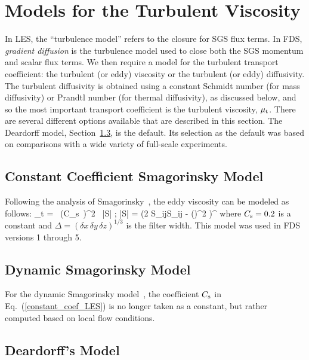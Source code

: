 \section{Models for the Turbulent Viscosity}
\label{section:turbulent_viscosity}

In LES, the ``turbulence model'' refers to the closure for SGS flux terms.  In FDS, \emph{gradient diffusion} is the turbulence model used to close both the SGS momentum and scalar flux terms.  We then require a model for the turbulent transport coefficient: the turbulent (or eddy) viscosity or the turbulent (or eddy) diffusivity.  The turbulent diffusivity is obtained using a constant Schmidt number (for mass diffusivity) or Prandtl number (for thermal diffusivity), as discussed below, and so the most important transport coefficient is the turbulent viscosity, $\mu_{\rm t}$. There are several different options available that are described in this section. The Deardorff model, Section~\ref{sec:deardorff}, is the default. Its selection as the default was based on comparisons with a wide variety of full-scale experiments.

\subsection{Constant Coefficient Smagorinsky Model}

Following the analysis of Smagorinsky~\cite{Smagorinsky:1}, the eddy viscosity can be modeled as follows:
\be
\mu_t = \rho \, (C_{\rm s}\, \Delta)^2 \, |S| \label{constant_coef_LES} \quad ; \quad |S| = \left(2 S_{ij}S_{ij} -  (\nabla\!\cdot \bu)^2 \right)^\ha
\ee
where $C_{\rm s}=0.2$ is a constant and $\Delta = (\delta x \, \delta y \, \delta z)^{1/3}$ is the filter width. This model was used in FDS versions 1 through 5. 

\subsection{Dynamic Smagorinsky Model}

For the dynamic Smagorinsky model~\cite{Germano:1}, the coefficient $C_{\rm s}$ in Eq.~(\ref{constant_coef_LES}) is no longer taken as a constant, but rather computed based on local flow conditions.

\subsection{Deardorff's Model}
\label{sec:deardorff}

